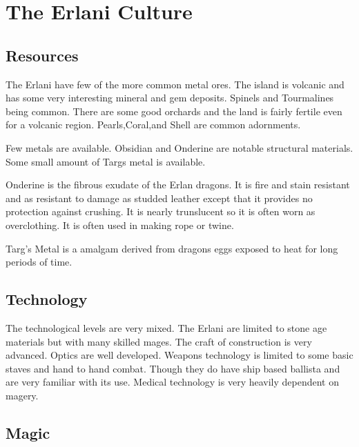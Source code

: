 \chapter{The Erlani Culture}

\section{Resources}

The Erlani have few of the more common metal ores.
The island is volcanic and has some very
interesting mineral and gem deposits. Spinels and Tourmalines being
common. There are some good orchards and the land is fairly
fertile even for a volcanic region. Pearls,Coral,and Shell are common
adornments.

Few metals are available. Obsidian and Onderine are notable structural
materials. Some small amount of Targs metal is available.

\begin{relate}
        \item[Onderine]
        is the fibrous exudate of the Erlan dragons. It is fire and stain
        resistant and as resistant to damage as studded leather except that
        it provides no protection against crushing. It is nearly trunslucent
        so it is often worn as overclothing. It is often used in making rope
        or twine.

        \item[Targ's Metal]
        is a amalgam derived from dragons eggs exposed to heat for long
        periods of time.

\end{relate}

\section{Technology}

The technological levels are very mixed. The Erlani are limited to
stone age materials but with many skilled mages. The craft of construction
is very advanced. Optics are well developed. Weapons technology is limited to
some basic staves and hand to hand combat. Though they do have ship based ballista
and are very familiar with its use. Medical technology is very
heavily dependent on magery.

\section{Magic}

